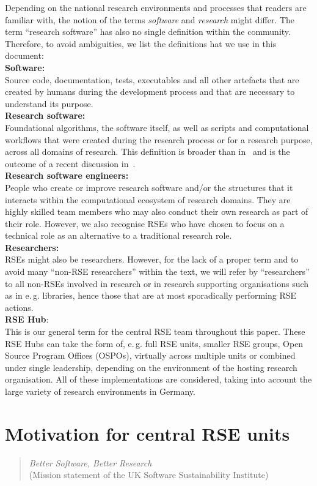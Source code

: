 \documentclass[a4paper]{article}
\makeatletter
\newcommand*{\eg}{e.\,g.\@\xspace}
\makeatother
\begin{document}
Depending on the national research environments and processes that readers are familiar with, the notion of the terms \emph{software} and \emph{research} might differ.
The term “research software” has also no single definition within the community.
Therefore, to avoid ambiguities, we list the definitions hat we use in this document:\\
\textbf{Software:}\\
Source code, documentation, tests, executables and all other artefacts that are created by humans during the development process and that are necessary to understand its purpose.\\
\textbf{Research software:}\\
Foundational algorithms, the software itself, as well as scripts and computational workflows that were created
during the research process or for a research purpose, across all domains of research.
This definition is broader than in~\autocite{FAIR4RS} and is the outcome of a recent discussion in~\autocite{Gruenpeter2021}.\\
\textbf{Research software engineers:}\\
People who create or improve research software and/or the structures that it interacts within the computational ecosystem of research domains.
They are highly skilled team members who may also conduct their own research as part of their role.
However, we also recognise RSEs who have chosen to focus on a technical role as an alternative to a traditional research role.\\
\textbf{Researchers:}\\
RSEs might also be researchers.
However, for the lack of a proper term and to avoid many “non-RSE researchers” within the text, we will refer by “researchers” to all non-RSEs involved in research or in research supporting organisations such as in \eg{} libraries, hence those that are at most sporadically performing RSE actions.\\
\textbf{RSE Hub}:\\
This is our general term for the central RSE team throughout this paper.
These RSE Hubs can take the form of, \eg{} full RSE units, smaller RSE groups, Open Source Program Offices (OSPOs), virtually across multiple units or combined under single leadership,
 depending on the environment of the hosting research organisation.
All of these implementations are considered, taking into account the large variety of research environments in Germany.

\section{Motivation for central RSE units}
\begin{quotation}
      \textit{Better Software, Better Research}\\(Mission statement of the UK Software Sustainability Institute)
\end{quotation}
\end{document}
